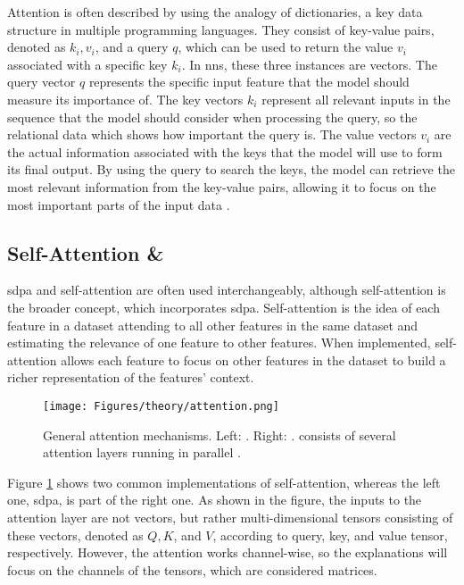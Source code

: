 Attention is often described by using the analogy of dictionaries, a key data structure in multiple programming languages. They consist of key-value pairs, denoted as \( k_i, v_i \), and a query \( q \), which can be used to return the value \( v_i \) associated with a specific key \( k_i \). In \glspl{nn}, these three instances are vectors. The query vector \( q \) represents the specific input feature that the model should measure its importance of. The key vectors \( k_i \) represent all relevant inputs in the sequence that the model should consider when processing the query, so the relational data which shows how important the query is. The value vectors \( v_i \) are the actual information associated with the keys that the model will use to form its final output. By using the query to search the keys, the model can retrieve the most relevant information from the key-value pairs, allowing it to focus on the most important parts of the input data \autocite{Brauwers.Frasincar2023,Han.Wang.ea2023,Szeliski2022,Vaswani.Shazeer.ea2017,Zhang.Lipton.ea2023}.

\subsection{Self-Attention \& }

\gls{sdpa} and self-attention are often used interchangeably, although self-attention is the broader concept, which incorporates \gls{sdpa}. Self-attention is the idea of each feature in a dataset attending to all other features in the same dataset and estimating the relevance of one feature to other features. When implemented, self-attention allows each feature to focus on other features in the dataset to build a richer representation of the features' context.

\begin{figure}[htb]
    \centering
    \texttt{[image: Figures/theory/attention.png]}
    \caption[Attention Mechanisms]{General attention mechanisms. Left: . Right: .  consists of several attention layers running in parallel \autocite{Liu.Zhang.ea2024,Vaswani.Shazeer.ea2017}.}
    \label{fig:attention}
\end{figure}

Figure \ref{fig:attention} shows two common implementations of self-attention, whereas the left one, \gls{sdpa}, is part of the right one. As shown in the figure, the inputs to the attention layer are not vectors, but rather multi-dimensional tensors consisting of these vectors, denoted as \( Q, K \), and \( V \), according to query, key, and value tensor, respectively. However, the attention works channel-wise, so the explanations will focus on the channels of the tensors, which are considered matrices. 

